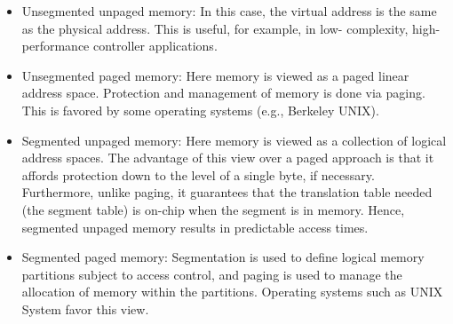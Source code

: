 \begin{itemize}
\item Unsegmented unpaged memory: In this case, the virtual address is the same
as the physical address. This is useful, for example, in low- complexity, high- performance controller applications.
\item Unsegmented paged memory: Here memory is viewed as a paged linear
address space. Protection and management of memory is done via paging.
This is favored by some operating systems (e.g., Berkeley UNIX).
\item Segmented unpaged memory: Here memory is viewed as a collection of
logical address spaces. The advantage of this view over a paged approach is
that it affords protection down to the level of a single byte, if necessary. Furthermore,
unlike paging, it guarantees that the translation table needed (the segment table) is on-chip
when the segment is in memory. Hence, segmented unpaged memory results in predictable access times.
\item Segmented paged memory: Segmentation is used to define logical memory
partitions subject to access control, and paging is used to manage the allocation
of memory within the partitions. Operating systems such as UNIX System favor this view.
\end{itemize}
